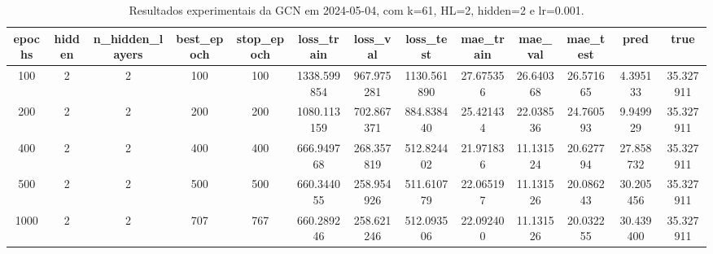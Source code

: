 \begin{table}[h]
\centering
\caption{Resultados experimentais da GCN em 2024-05-04, com k=61, HL=2, hidden=2 e lr=0.001.}
\label{tab:gcn_results_k61_hl2_h2_d20240504}
\begin{tabular}{ccccccccccccc}
\toprule
epochs & hidden & n\_hidden\_layers & best\_epoch & stop\_epoch & loss\_train & loss\_val & loss\_test & mae\_train & mae\_val & mae\_test & pred & true \\
\midrule
100 & 2 & 2 & 100 & 100 & 1338.599854 & 967.975281 & 1130.561890 & 27.675356 & 26.640368 & 26.571665 & 4.395133 & 35.327911 \\
200 & 2 & 2 & 200 & 200 & 1080.113159 & 702.867371 & 884.838440 & 25.421434 & 22.038536 & 24.760593 & 9.949929 & 35.327911 \\
400 & 2 & 2 & 400 & 400 & 666.949768 & 268.357819 & 512.824402 & 21.971836 & 11.131524 & 20.627794 & 27.858732 & 35.327911 \\
500 & 2 & 2 & 500 & 500 & 660.344055 & 258.954926 & 511.610779 & 22.065197 & 11.131526 & 20.086243 & 30.205456 & 35.327911 \\
1000 & 2 & 2 & 707 & 767 & 660.289246 & 258.621246 & 512.093506 & 22.092400 & 11.131526 & 20.032255 & 30.439400 & 35.327911 \\
\bottomrule
\end{tabular}
\end{table}
